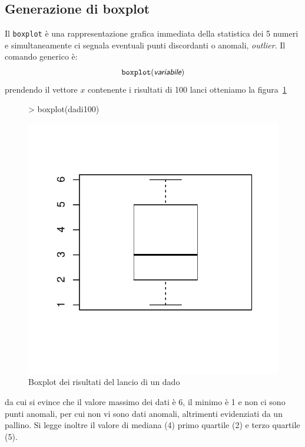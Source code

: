 \documentclass[onecolumn,12pt]{book}
\newcommand{\varia}[1]{\textsl{\textsf{#1}}}
\begin{document}
\subsection{Generazione di boxplot}

Il \texttt{boxplot}  \`e una rappresentazione grafica immediata della statistica dei 5 numeri e simultaneamente ci  segnala eventuali punti discordanti o anomali, {\it outlier}.
Il comando generico \`e: \begin{equation}\texttt{boxplot}(\varia{variabile})\end{equation}
prendendo il vettore $x$ contenente i risultati di 100 lanci
otteniamo la figura~\ref{fig:boxplotdado}
\begin{figure}[htbp]
\begin{center}
\begin{Schunk}
\begin{Sinput}
> boxplot(dadi100)
\end{Sinput}
\end{Schunk}
\includegraphics{RbookParte2-042}
\caption{Boxplot dei risultati del lancio di un dado}
\label{fig:boxplotdado}
\end{center}
\end{figure}
da cui si evince che il valore massimo dei dati \`e 6, il minimo \`e 1 e non ci sono punti anomali, per cui non vi sono dati anomali, altrimenti evidenziati da un pallino. Si legge inoltre il valore di mediana (4) primo quartile (2) e terzo quartile (5).
\end{document}
